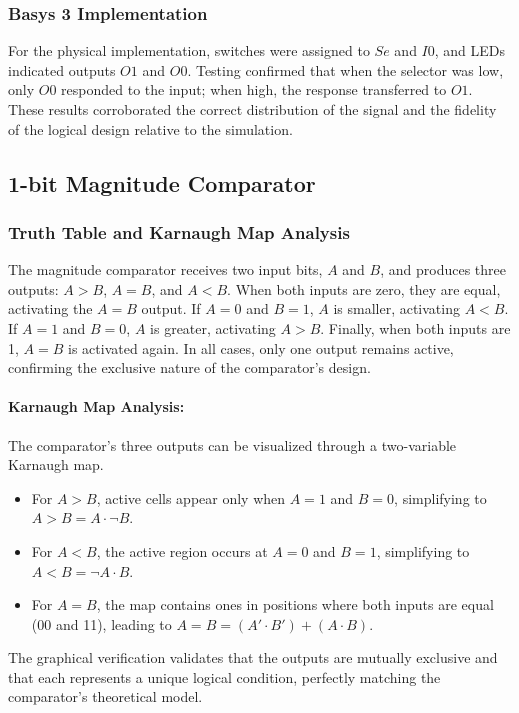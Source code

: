 \documentclass[12pt]{article}  %
\begin{document}
\subsubsection{Basys 3 Implementation}
For the physical implementation, switches were assigned to
$Se$ and $I0$, and LEDs indicated outputs $O1$ and $O0$. Testing confirmed that when
the selector was low, only $O0$ responded to the input; when high, the response
transferred to $O1$. These results corroborated the correct distribution of the
signal and the fidelity of the logical design relative to the simulation.

\subsection{1-bit Magnitude Comparator}

\subsubsection{Truth Table and Karnaugh Map Analysis}
The magnitude comparator receives two input bits, $A$ and $B$,
and produces three outputs: $A > B$, $A = B$, and $A < B$. When both inputs are zero, 
they are equal, activating the $A = B$ output. If $A = 0$ and $B = 1$, $A$ is smaller, 
activating $A < B$. If $A = 1$ and $B = 0$, $A$ is greater, activating $A > B$. 
Finally, when both inputs are 1, $A = B$ is activated again. In all cases, 
only one output remains active, confirming the
exclusive nature of the comparator’s design.

\paragraph{Karnaugh Map Analysis:}
The comparator’s three outputs can be visualized through a two-variable
Karnaugh map.
\begin{itemize}
    \item For $A > B$, active cells appear only when $A = 1$ and $B = 0$, 
        simplifying to $A > B = A \cdot \neg B$.
    \item For $A < B$, the active region occurs at $A = 0$ and $B = 1$, 
        simplifying to $A < B = \neg A \cdot B$.
    \item For $A = B$, the map contains ones in positions where both
        inputs are equal (00 and 11), leading to $A = B = (A'\cdot B') + (A\cdot B)$.
\end{itemize}
The graphical verification validates that the outputs are mutually exclusive
and that each represents a unique logical condition, perfectly matching
the comparator’s theoretical model.
\end{document}
